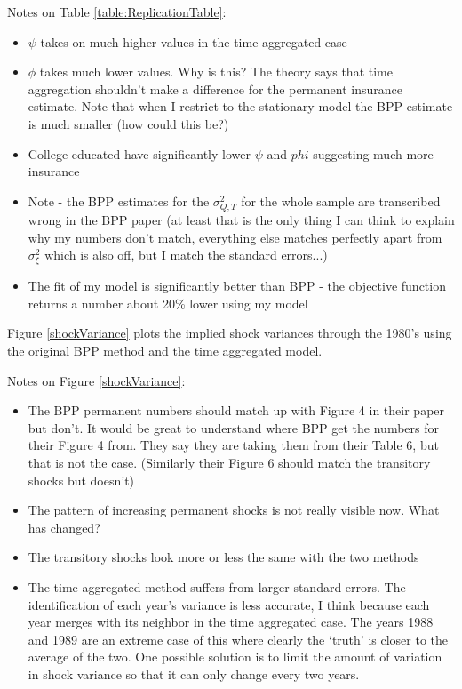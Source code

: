 \documentclass[titlepage]{\econtex}\newcommand{\texname}{BPP_PSID_TimeAgg}
\begin{document}


Notes on Table \ref{table:ReplicationTable}:
\begin{itemize}
	\item $\psi$ takes on much higher values in the time aggregated case
	\item $\phi$ takes much lower values. Why is this? The theory says that time aggregation shouldn't make a difference for the permanent insurance estimate. Note that when I restrict to the stationary model the BPP estimate is much smaller (how could this be?)
	\item College educated have significantly lower $\psi$ and $phi$ suggesting much more insurance
	\item Note - the BPP estimates for the $\sigma^2_{Q,T}$ for the whole sample are transcribed wrong in the BPP paper (at least that is the only thing I can think to explain why my numbers don't match, everything else matches perfectly apart from $\sigma^2_{\xi}$ which is also off, but I match the standard errors...)
	\item The fit of my model is significantly better than BPP - the objective function returns a number about 20\% lower using my model
\end{itemize}

Figure \ref{shockVariance} plots the implied shock variances through the 1980's using the original BPP method and the time aggregated model.

Notes on Figure \ref{shockVariance}:
\begin{itemize}
	\item The BPP permanent numbers should match up with Figure 4 in their paper but don't. It would be great to understand where BPP get the numbers for their Figure 4 from. They say they are taking them from their Table 6, but that is not the case. (Similarly their Figure 6 should match the transitory shocks but doesn't)
	\item The pattern of increasing permanent shocks is not really visible now. What has changed?
	\item The transitory shocks look more or less the same with the two methods
	\item The time aggregated method suffers from larger standard errors. The identification of each year's variance is less accurate, I think because each year merges with its neighbor in the time aggregated case. The years 1988 and 1989 are an extreme case of this where clearly the `truth' is closer to the average of the two. One possible solution is to limit the amount of variation in shock variance so that it can only change every two years.
\end{itemize}
\end{document}
